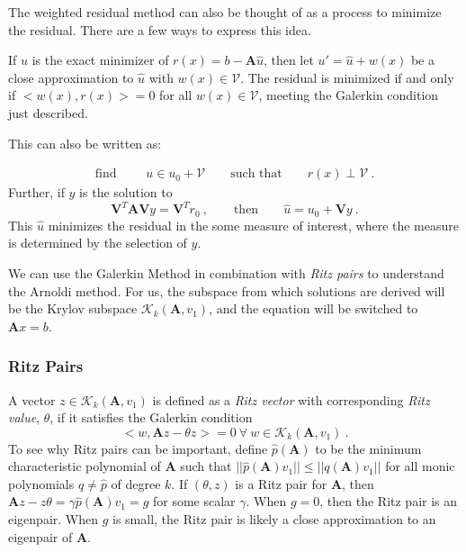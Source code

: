 \documentclass[12pt]{article}
\newcommand{\ve}[1]{\ensuremath{\mathbf{#1}}}
\begin{document}
The weighted residual method can also be thought of as a process to minimize the residual. There are a few ways to express this idea. 
\begin{compactitem}
\item If $\hat{u}$ is the exact minimizer of $r(x) = b - \ve{A}\hat{u}$, then let $u' = \hat{u} + w(x)$ be a close approximation to $\hat{u}$ with $w(x) \in \mathcal{V}$. The residual is minimized if and only if $<w(x), r(x)> = 0$ for all $w(x) \in \mathcal{V}$, meeting the Galerkin condition just described. 

\item This can also be written as: 

\begin{align}
  \text{find } \qquad u \in u_{0} + \mathcal{V} \qquad \text{such that} \qquad r(x) \perp \mathcal{V} \:.
  \label{eq:galerkinMin}
\end{align}
%
Further, if $y$ is the solution to
\begin{equation}
  \ve{V}^{T}\ve{AV}y = \ve{V}^{T} r_{0} \:, \qquad \text{then} \qquad \hat{u} = u_{0} + \ve{V}y \:.
  \label{eq:minResidual}
\end{equation}
This $\hat{u}$ minimizes the residual in the some measure of interest, where the measure is determined by the selection of $y$. %
\end{compactitem}

We can use the Galerkin Method in combination with \textit{Ritz pairs} to understand the Arnoldi method. %
For us, the subspace from which solutions are derived %
will be the Krylov subspace $\mathcal{K}_{k}(\ve{A},v_{1})$, and the equation will be switched to $\ve{A}x = b$.

\subsubsection*{Ritz Pairs}
A vector $z \in \mathcal{K}_{k}(\ve{A},v_{1})$ is defined as a \textit{Ritz vector} with corresponding \textit{Ritz value}, $\theta$, if it satisfies the Galerkin condition 
\[
<w, \ve{A}z - \theta z> = 0  \:\forall\: w \in \mathcal{K}_{k}(\ve{A}, v_{1})\:.
\]
To see why Ritz pairs can be important, define $\hat{p}(\ve{A})$ to be the minimum characteristic polynomial of $\ve{A}$ such that $||\hat{p}(\ve{A})v_{1}|| \le ||q(\ve{A})v_{1}||$ for all monic polynomials $q \ne \hat{p}$ of degree $k$. If $(\theta, z)$ is a Ritz pair for $\ve{A}$, then $\ve{A}z - z\theta = \gamma \hat{p}(\ve{A})v_{1} = g$ for some scalar $\gamma$. When $g = 0$, then the Ritz pair is an eigenpair. When $g$ is small, the Ritz pair is likely a close approximation to an eigenpair of $\ve{A}$.%
\end{document}
